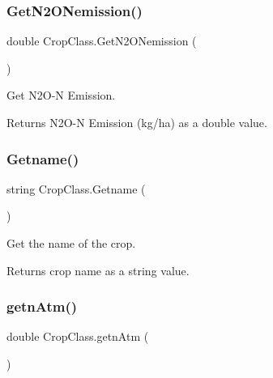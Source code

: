 \subsubsection{\texorpdfstring{GetN2ONemission()}{GetN2ONemission()}}
{\footnotesize\ttfamily double Crop\+Class.\+Get\+N2\+O\+Nemission (\begin{DoxyParamCaption}{ }\end{DoxyParamCaption})\hspace{0.3cm}{\ttfamily [inline]}}



Get N2\+O-\/N Emission. 

\begin{DoxyReturn}{Returns}
N2\+O-\/N Emission (kg/ha) as a double value. 
\end{DoxyReturn}
\mbox{\label{class_crop_class_a84905f5c6057de9d1eb2c1b6ff29d69d}} 
\subsubsection{\texorpdfstring{Getname()}{Getname()}}
{\footnotesize\ttfamily string Crop\+Class.\+Getname (\begin{DoxyParamCaption}{ }\end{DoxyParamCaption})\hspace{0.3cm}{\ttfamily [inline]}}



Get the name of the crop. 

\begin{DoxyReturn}{Returns}
crop name as a string value. 
\end{DoxyReturn}
\mbox{\label{class_crop_class_a917149eeb182c83f27ca4d028a660204}} 
\subsubsection{\texorpdfstring{getnAtm()}{getnAtm()}}
{\footnotesize\ttfamily double Crop\+Class.\+getn\+Atm (\begin{DoxyParamCaption}{ }\end{DoxyParamCaption})\hspace{0.3cm}{\ttfamily [inline]}}




